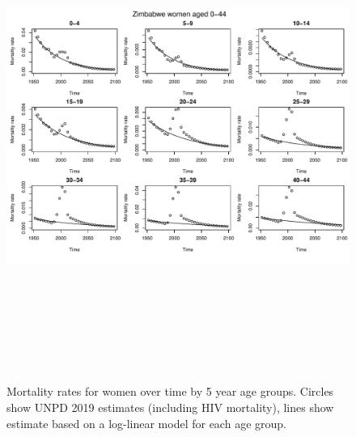 \documentclass{article}
\begin{document}
\begin{figure}
\includegraphics[width=16cm,height=16cm]{EstimatingRatesFromUNPDv2-MortalityWomen1} 

\caption{Mortality rates for women over time by 5 year age groups. Circles show UNPD 2019 estimates (including HIV mortality), lines show estimate based on a log-linear model for each age group.}
\label{Mortalitywomen1}
\end{figure}
\end{document}
